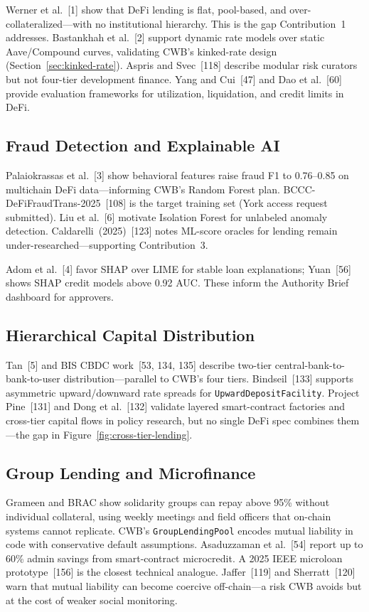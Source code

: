 \documentclass[12pt,a4paper]{report}
\begin{document}
Werner et al.~[1] show that DeFi lending is flat, pool-based, and over-collateralized---with no institutional hierarchy. This is the gap Contribution~1 addresses. Bastankhah et al.~[2] support dynamic rate models over static Aave/Compound curves, validating CWB's kinked-rate design (Section~\ref{sec:kinked-rate}). Aspris and Svec~[118] describe modular risk curators but not four-tier development finance. Yang and Cui~[47] and Dao et al.~[60] provide evaluation frameworks for utilization, liquidation, and credit limits in DeFi.

\subsection{Fraud Detection and Explainable AI}
\label{sec:lit-ml-oracle}

Palaiokrassas et al.~[3] show behavioral features raise fraud F1 to 0.76--0.85 on multichain DeFi data---informing CWB's Random Forest plan. BCCC-DeFiFraudTrans-2025~[108] is the target training set (York access request submitted). Liu et al.~[6] motivate Isolation Forest for unlabeled anomaly detection. Caldarelli~(2025)~[123] notes ML-score oracles for lending remain under-researched---supporting Contribution~3.

Adom et al.~[4] favor SHAP over LIME for stable loan explanations; Yuan~[56] shows SHAP credit models above 0.92 AUC. These inform the Authority Brief dashboard for approvers.

\subsection{Hierarchical Capital Distribution}
\label{sec:lit-cross-tier}

Tan~[5] and BIS CBDC work~[53, 134, 135] describe two-tier central-bank-to-bank-to-user distribution---parallel to CWB's four tiers. Bindseil~[133] supports asymmetric upward/downward rate spreads for \texttt{UpwardDepositFacility}. Project Pine~[131] and Dong et al.~[132] validate layered smart-contract factories and cross-tier capital flows in policy research, but no single DeFi spec combines them---the gap in Figure~\ref{fig:cross-tier-lending}.

\subsection{Group Lending and Microfinance}

Grameen and BRAC show solidarity groups can repay above 95\% without individual collateral, using weekly meetings and field officers that on-chain systems cannot replicate. CWB's \texttt{GroupLendingPool} encodes mutual liability in code with conservative default assumptions. Asaduzzaman et al.~[54] report up to 60\% admin savings from smart-contract microcredit. A 2025 IEEE microloan prototype~[156] is the closest technical analogue. Jaffer~[119] and Sherratt~[120] warn that mutual liability can become coercive off-chain---a risk CWB avoids but at the cost of weaker social monitoring.
\end{document}
